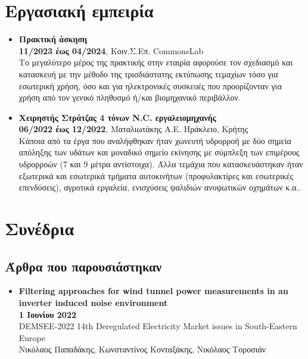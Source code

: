 \documentclass[a4paper,9pt]{extarticle}
\begin{document}
\section*{Εργασιακή εμπειρία}
\noindent
\begin{itemize}
  \item{\textbf{Πρακτική άσκηση}}\\
        \textbf{11/2023 έως 04/2024}, Κοιν.Σ.Επ. CommonsLab \\
        Το μεγαλύτερο μέρος της πρακτικής στην εταιρία αφορούσε τον σχεδιασμό και κατασκευή με την μέθοδο της τρισδιάστατης εκτύπωσης τεμαχίων τόσο για εσωτερική χρήση, όσο και για ηλεκτρονικές συσκευές που προορίζονταν για χρήση από τον γενικό πληθυσμό ή/και βιομηχανικό περιβάλλον. \\
  \item{\textbf{Χειρηστής Στράτζας 4 τόνων N.C.  εργαλειομηχανής}} \\
        \textbf{06/2022 έως 12/2022}, Ματαλιωτάκης Α.Ε. Ηράκλειο, Κρήτης \\
        Κάποια από τα έργα που αναλήφθηκαν ήταν χωνευτή υδρορροή με δύο σημεία απόληξης των υδάτων και μοναδικό σημείο εκίνησης με σύμπλεξη των επιμέρους υδρορροών (7 και 9 μέτρα αντίστοιχα). Άλλα τεμάχια που κατασκευάστηκαν ήταν εξωτερικά και εσωτερικά τμήματα αυτοκινήτων (προφυλακτίρες και εσωτερικές επενδύσεις), αγροτικά εργαλεία, ενισχύσεις ψαλιδιών ανυψωτικών οχημάτων κ.α.. \\
\end{itemize}




\section*{Συνέδρια}

\subsection*{Άρθρα που παρουσιάστηκαν}
\begin{itemize}
  \item{\textbf{Filtering approaches for wind tunnel power measurements in an inverter
        induced noise environment}} \\
        \textbf{1 Ιουνίου 2022} \\
        DEMSEE-2022 14th Deregulated Electricity Market issues in South-Eastern Europe \\
        Νικόλαος Παπαδάκης, Κωνσταντίνος Κονταξάκης, Νικόλαος Τοροσιάν
\end{itemize}
\end{document}
